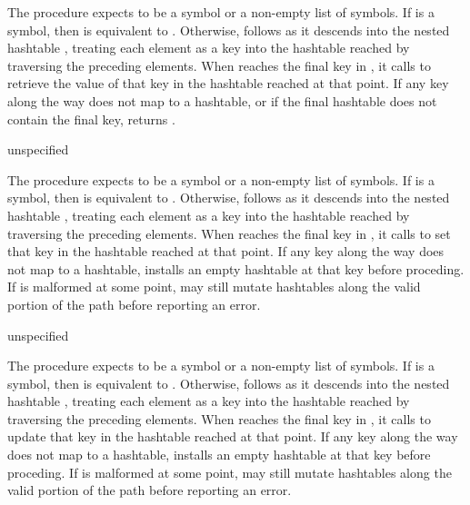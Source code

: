 The  procedure expects  to be a symbol or
a non-empty list of symbols.
If  is a symbol, then  is equivalent
to .
Otherwise,  follows  as it descends into
the nested hashtable , treating each element as a key into
the hashtable reached by traversing the preceding elements.
When  reaches the final key in ,
it calls  to retrieve the value of that key
in the hashtable reached at that point.
If any key along the way does not map to a hashtable,
or if the final hashtable does not contain the final key,
 returns .

\begin{procedure}
\end{procedure}
\returns{} unspecified

The  procedure expects  to be a symbol or
a non-empty list of symbols.
If  is a symbol, then  is equivalent
to .
Otherwise,  follows  as it descends into
the nested hashtable , treating each element as a key into
the hashtable reached by traversing the preceding elements.
When  reaches the final key in ,
it calls  to set that key in the
hashtable reached at that point.
If any key along the way does not map to a hashtable,
 installs an empty hashtable at that key
before proceding.
If  is malformed at some point,  may
still mutate hashtables along the valid portion of the path
before reporting an error.

\begin{procedure}
\end{procedure}
\returns{} unspecified

The  procedure expects  to be a symbol or
a non-empty list of symbols.
If  is a symbol, then  is equivalent
to .
Otherwise,  follows  as it descends into
the nested hashtable , treating each element as a key into
the hashtable reached by traversing the preceding elements.
When  reaches the final key in ,
it calls  to update that key in the
hashtable reached at that point.
If any key along the way does not map to a hashtable,
 installs an empty hashtable at that key
before proceding.
If  is malformed at some point,  may
still mutate hashtables along the valid portion of the path
before reporting an error.

